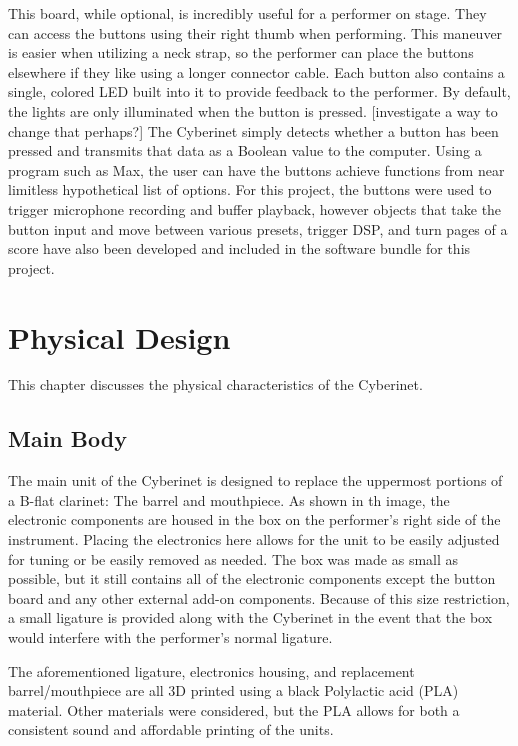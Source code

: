 This board, while optional, is incredibly useful for a performer on stage. They can access the buttons using their right thumb when performing. This maneuver is easier when utilizing a neck strap, so the performer can place the buttons elsewhere if they like using a longer connector cable. Each button also contains a single, colored LED built into it to provide feedback to the performer. By default, the lights are only illuminated when the button is pressed. [investigate a way to change that perhaps?] The Cyberinet simply detects whether a button has been pressed and transmits that data as a Boolean value to the computer. Using a program such as Max, the user can have the buttons achieve functions from near limitless hypothetical list of options. For this project, the buttons were used to trigger microphone recording and buffer playback, however objects that take the button input and move between various presets, trigger DSP, and turn pages of a score have also been developed and included in the software bundle for this project.

\chapter{Physical Design}
This chapter discusses the physical characteristics of the Cyberinet.

\section{Main Body}

The main unit of the Cyberinet is designed to replace the uppermost portions of a B-flat clarinet: The barrel and mouthpiece. As shown in th image, the electronic components are housed in the box on the performer's right side of the instrument. Placing the electronics here allows for the unit to be easily adjusted for tuning or be easily removed as needed. The box was made as small as possible, but it still contains all of the electronic components except the button board and any other external add-on components. Because of this size restriction, a small ligature is provided along with the Cyberinet in the event that the box would interfere with the performer's normal ligature.

The aforementioned ligature, electronics housing, and replacement barrel/mouthpiece are all 3D printed using a black Polylactic acid (PLA) material. Other materials were considered, but the PLA allows for both a consistent sound and affordable printing of the units.


